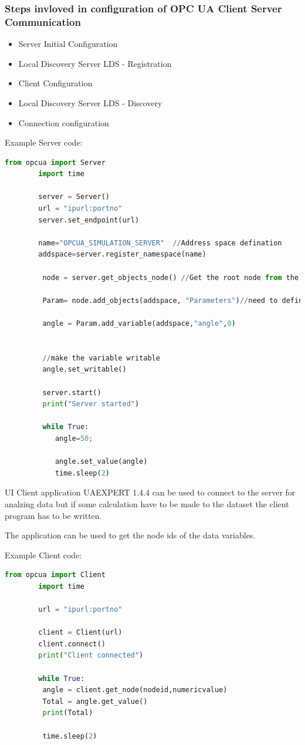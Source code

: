 \documentclass{article}
\begin{document}
	\subsubsection{Steps invloved in configuration of OPC UA Client Server Communication}
	\begin{itemize}
	\item Server Initial Configuration
	\item Local Discovery Server LDS - Registration 
	\item Client Configuration
	\item Local Discovery Server LDS - Discovery 
	\item Connection configuration
	 \end{itemize}	
	 
	 Example Server code:
	 \begin{lstlisting}[language=Python]
		from opcua import Server
		import time
		
		server = Server()
		url = "ipurl:portno"
		server.set_endpoint(url)
		
		name="OPCUA_SIMULATION_SERVER"  //Address space defination
		addspace=server.register_namespace(name)
		 
		 node = server.get_objects_node() //Get the root node from the address space
		 
		 Param= node.add_objects(addspace, "Parameters")//need to define a node where we need to store the parameter
		 
		 angle = Param.add_variable(addspace,"angle",0)
		 
		 
		 //make the variable writable
		 angle.set_writable()
		 
		 server.start()
		 print("Server started")
		 
		 while True:
		 	angle=50;
		 	
		 	angle.set_value(angle)	
		 	time.sleep(2)
		\end{lstlisting}
UI Client application UAEXPERT 1.4.4 can be used to connect to the server for analzing data but if some calculation have to be made to the dataset the client program has to be written.  	

The application can be used to get the node ids of the data variables.	
		
		Example Client code:
	 \begin{lstlisting}[language=Python]
		from opcua import Client
		import time
		
		url = "ipurl:portno"
		
		client = Client(url)
		client.connect()
		print("Client connected")
		
		while True:
		 angle = client.get_node(nodeid,numericvalue)
		 Total = angle.get_value()
		 print(Total)
		 		 
		 time.sleep(2)
		\end{lstlisting}
		
\end{document}
